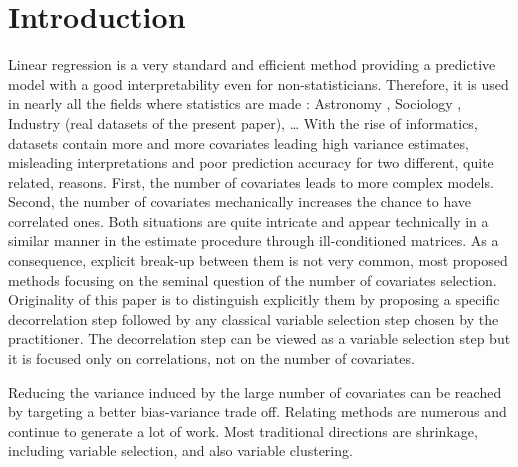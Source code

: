 \documentclass[11pt,a4paper]{article}
\begin{document}
\section{Introduction}\label{sec:intro}
Linear regression is a very standard and efficient method providing a predictive model with a good interpretability even for non-statisticians. Therefore, it is used in nearly all the fields where statistics are made \cite{montgomery2012introduction}: Astronomy \cite{isobe1990linear}, Sociology \cite{longford2012revision}, Industry (real datasets of the present paper), \dots
With the rise of informatics, datasets contain more and more covariates leading high variance estimates, misleading interpretations and poor prediction accuracy for two different, quite related, reasons. First, the number of covariates leads to more complex models. Second, the number of covariates mechanically increases the chance to have correlated ones. Both situations are quite intricate and appear technically in a similar manner in the estimate procedure through ill-conditioned matrices. As a consequence, explicit break-up between them is not very common, most proposed methods focusing on the seminal question of the number of covariates selection. Originality of this paper is to distinguish explicitly them by proposing a specific decorrelation step followed by any classical variable selection step chosen by the practitioner. The decorrelation step can be viewed as a variable selection step but it is focused only on correlations, not on the number of covariates.


\vspace{3mm}
		

Reducing the variance induced by the large number of covariates can be reached by targeting a better bias-variance trade off. Relating methods are numerous and continue to generate a lot of work. Most traditional directions are shrinkage, including variable selection, and also variable clustering.
\end{document}
